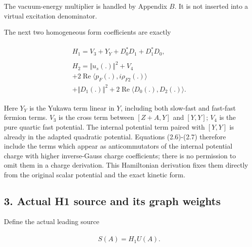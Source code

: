The vacuum-energy multiplier is handled by Appendix \(B\). It is not
inserted into a virtual excitation denominator.

The next two homogeneous form coefficients are exactly

\begin{gather*}
\begin{aligned}
& H_{1} = V_{3}+Y_{Y} +D_{0}^{*}D_{1}+D_{1}^{*}D_{0},
\end{aligned}\tag{2.6} \\
\begin{aligned}
& H_{2} = \Vert u_{s} (.)\Vert ^{2} +V_{4} \\
& +2 \operatorname{Re}  \langle p_{F}(.),i \rho _{F2}(.)\rangle \\
& +\Vert D_{1}(.)\Vert ^{2}+2 \operatorname{Re}  \langle D_{0}(.),D_{2}(.)\rangle .
\end{aligned}\tag{2.7}
\end{gather*}

Here \(Y_{Y}\) is the Yukawa term linear in \(Y\), including both
slow-fast and fast-fast fermion terms. \(V_{3}\) is the cross term
between \([Z+A,Y]\) and \([Y,Y]\); \(V_{4}\) is the pure quartic fast
potential. The internal potential term paired with \([Y,Y]\) is already
in the adapted quadratic potential. Equations (2.6)-(2.7) therefore
include the terms which appear as anticommutators of the internal
potential charge with higher inverse-Gauss charge coefficients; there is
no permission to omit them in a charge derivation. This Hamiltonian
derivation fixes them directly from the original scalar potential and
the exact kinetic form.

\subsection{3. Actual H1 source and its graph
weights}\label{d-actual-h1-source-and-its-graph-weights}

Define the actual leading source

\begin{gather*}
\begin{aligned}
& S(A) = H_{1} U(A).
\end{aligned}\tag{3.1}
\end{gather*}

